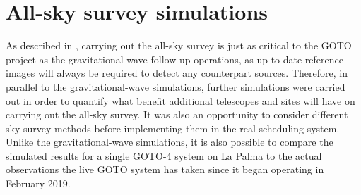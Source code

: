 
\section{All-sky survey simulations}
\label{sec:survey_sims}


\begin{colsection}

As described in , carrying out the all-sky survey is just as critical to the GOTO project as the gravitational-wave follow-up operations, as up-to-date reference images will always be required to detect any counterpart sources. Therefore, in parallel to the gravitational-wave simulations, further simulations were carried out in order to quantify what benefit additional telescopes and sites will have on carrying out the all-sky survey. It was also an opportunity to consider different sky survey methods before implementing them in the real scheduling system. Unlike the gravitational-wave simulations, it is also possible to compare the simulated results for a single GOTO-4 system on La Palma to the actual observations the live GOTO system has taken since it began operating in February 2019.

\end{colsection}


